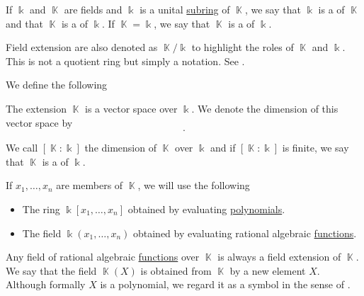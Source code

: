 \begin{definition}\label{def:field_extension}
  If \( \Bbbk \) and \( \BbbK \) are fields and \( \Bbbk \) is a unital \hyperref[def:first_order_substructure]{subring} of \( \BbbK \), we say that \( \Bbbk \) is a  of \( \BbbK \) and that \( \BbbK \) is a  of \( \Bbbk \). If \( \BbbK = \Bbbk \), we say that \( \BbbK \) is a  of \( \Bbbk \).

  Field extension are also denoted as \( \BbbK / \Bbbk \) to highlight the roles of \( \BbbK \) and \( \Bbbk \). This is not a quotient ring but simply a notation. See .

  We define the following
  \begin{defenum}
     The extension \( \BbbK \) is a vector space over \( \Bbbk \). We denote the dimension of this vector space by
    \begin{equation*}
      [\BbbK : \Bbbk].
    \end{equation*}

    We call \( [\BbbK : \Bbbk] \) the dimension of \( \BbbK \) over \( \Bbbk \) and if \( [\BbbK : \Bbbk] \) is finite, we say that \( \BbbK \) is a  of \( \Bbbk \).

     If \( x_1, \ldots, x_n \) are members of \( \BbbK \), we will use the following
    \begin{itemize}
      \item The ring \( \Bbbk[x_1, \ldots, x_n] \) obtained by evaluating \hyperref[thm:polynomial_ring_universal_property]{polynomials}.
      \item The field \( \Bbbk(x_1, \ldots, x_n) \) obtained by evaluating rational algebraic \hyperref[def:rational_algebraic_function]{functions}.
    \end{itemize}
  \end{defenum}
\end{definition}

\begin{remark}\label{rem:adjoint_extension_field}
  Any field of rational algebraic \hyperref[def:rational_algebraic_function]{functions} over \( \BbbK \) is always a field extension of \( \BbbK \). We say that the field \( \BbbK(X) \) is obtained from \( \BbbK \) by  a new element \( X \). Although formally \( X \) is a polynomial, we regard it as a symbol in the sense of .
\end{remark}

